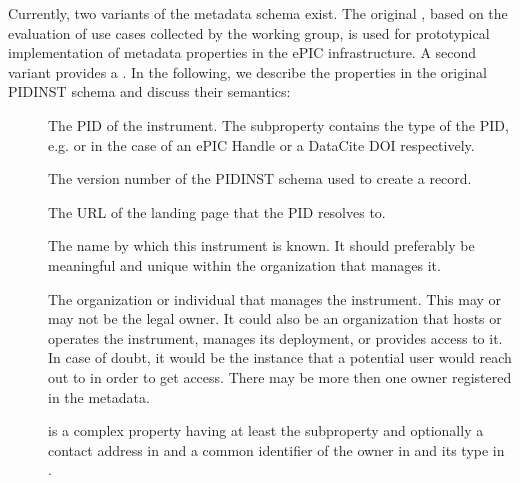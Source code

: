 \documentclass[a4paper,10pt,english]{sphinxmanual}
\begin{document}
\sphinxAtStartPar
Currently, two variants of the metadata schema exist.  The original
, based on the evaluation of use cases collected by
the working group, is used for prototypical implementation of metadata
properties in the ePIC infrastructure.  A second variant provides a
.  In the following, we
describe the properties in the original PIDINST schema and discuss
their semantics:
\begin{description}
\item[{}] \leavevmode
\sphinxAtStartPar
The PID of the instrument.  The subproperty 
contains the type of the PID, e.g.  or  in the case of
an ePIC Handle or a DataCite DOI respectively.

\item[{}] \leavevmode
\sphinxAtStartPar
The version number of the PIDINST schema used to create a record.

\item[{}] \leavevmode
\sphinxAtStartPar
The URL of the landing page that the PID resolves to.

\item[{}] \leavevmode
\sphinxAtStartPar
The name by which this instrument is known.  It should preferably be
meaningful and unique within the organization that manages it.

\item[{}] \leavevmode
\sphinxAtStartPar
The organization or individual that manages the instrument.  This
may or may not be the legal owner.  It could also be an organization
that hosts or operates the instrument, manages its deployment, or
provides access to it.  In case of doubt, it would be the instance
that a potential user would reach out to in order to get access.
There may be more then one owner registered in the metadata.

\sphinxAtStartPar
{} is a complex property having at least the subproperty
 and optionally a contact address in  and a
common identifier of the owner in  and its type in
.


\end{description}
\end{document}
